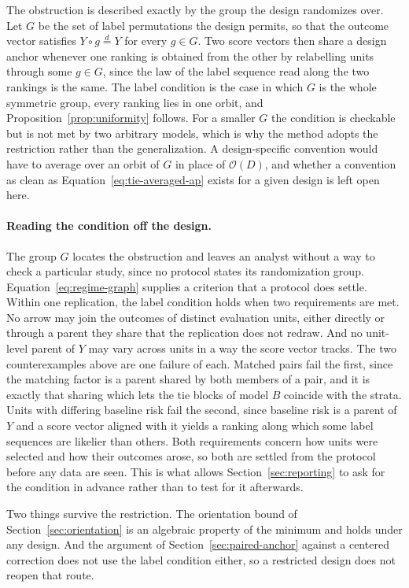 \documentclass[11pt]{article}
\theoremstyle{remark}
\begin{document}
The obstruction is described exactly by the group the design randomizes over. Let $G$ be the set of label permutations the design permits, so that the outcome vector satisfies $Y\circ g\overset{d}{=}Y$ for every $g\in G$. Two score vectors then share a design anchor whenever one ranking is obtained from the other by relabelling units through some $g\in G$, since the law of the label sequence read along the two rankings is the same. The label condition is the case in which $G$ is the whole symmetric group, every ranking lies in one orbit, and Proposition~\ref{prop:uniformity} follows. For a smaller $G$ the condition is checkable but is not met by two arbitrary models, which is why the method adopts the restriction rather than the generalization. A design-specific convention would have to average over an orbit of $G$ in place of $\mathcal{O}(D)$, and whether a convention as clean as Equation~\eqref{eq:tie-averaged-ap} exists for a given design is left open here.

\paragraph{Reading the condition off the design.}
The group $G$ locates the obstruction and leaves an analyst without a way to check a particular study, since no protocol states its randomization group. Equation~\eqref{eq:regime-graph} supplies a criterion that a protocol does settle. Within one replication, the label condition holds when two requirements are met. No arrow may join the outcomes of distinct evaluation units, either directly or through a parent they share that the replication does not redraw. And no unit-level parent of $Y$ may vary across units in a way the score vector tracks. The two counterexamples above are one failure of each. Matched pairs fail the first, since the matching factor is a parent shared by both members of a pair, and it is exactly that sharing which lets the tie blocks of model $B$ coincide with the strata. Units with differing baseline risk fail the second, since baseline risk is a parent of $Y$ and a score vector aligned with it yields a ranking along which some label sequences are likelier than others. Both requirements concern how units were selected and how their outcomes arose, so both are settled from the protocol before any data are seen. This is what allows Section~\ref{sec:reporting} to ask for the condition in advance rather than to test for it afterwards.

Two things survive the restriction. The orientation bound of Section~\ref{sec:orientation} is an algebraic property of the minimum and holds under any design. And the argument of Section~\ref{sec:paired-anchor} against a centered correction does not use the label condition either, so a restricted design does not reopen that route.
\end{document}
